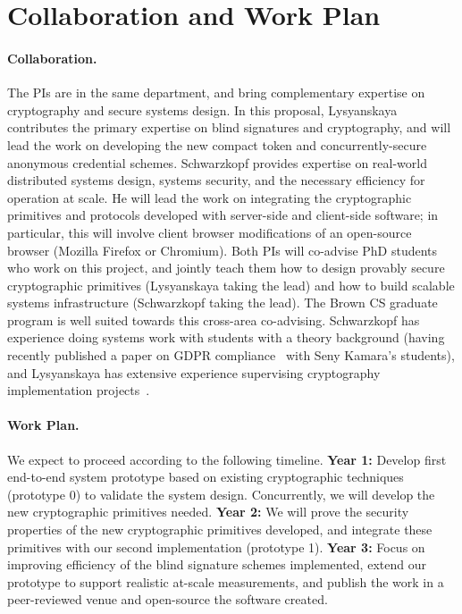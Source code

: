 \section{Collaboration and Work Plan}

\paragraph{Collaboration.}
%
The PIs are in the same department, and bring complementary expertise on cryptography and secure systems design.
%
In this proposal, Lysyanskaya contributes the primary expertise on blind signatures and cryptography, and will lead the work on developing the new compact token and concurrently-secure anonymous credential schemes.
%
Schwarzkopf provides expertise on real-world distributed systems design, systems security, and the necessary efficiency for operation at scale.
%
He will lead the work on integrating the cryptographic primitives and protocols developed with server-side and client-side software; in particular, this will involve client browser modifications of an open-source browser (Mozilla Firefox or Chromium).
%
Both PIs will co-advise PhD students who work on this project, and jointly teach them how to design provably secure cryptographic primitives (Lysyanskaya taking the lead) and how to build scalable systems infrastructure (Schwarzkopf taking the lead).
%
The Brown CS graduate program is well suited towards this cross-area co-advising.
%
Schwarzkopf has experience doing systems work with students with a theory background (\eg having recently published a paper on GDPR compliance~\cite{gdprizer} with Seny Kamara's students), and Lysyanskaya has extensive experience supervising cryptography implementation projects~\cite{mekhl10,bhrlpb12,hzblpb13,bcdlrsy17}. 
%

\paragraph{Work Plan.}
%
We expect to proceed according to the following timeline.
%
\textbf{Year 1:} Develop first end-to-end system prototype based on existing cryptographic techniques (prototype 0) to validate the system design. Concurrently, we will develop the new cryptographic primitives needed.
%
\textbf{Year 2:} We will prove the security properties of the new cryptographic primitives developed, and integrate these primitives with our second implementation (prototype 1).
%
\textbf{Year 3:} Focus on improving efficiency of the blind signature schemes implemented, extend our prototype to support realistic at-scale measurements, and publish the work in a peer-reviewed venue and open-source the software created.
%
